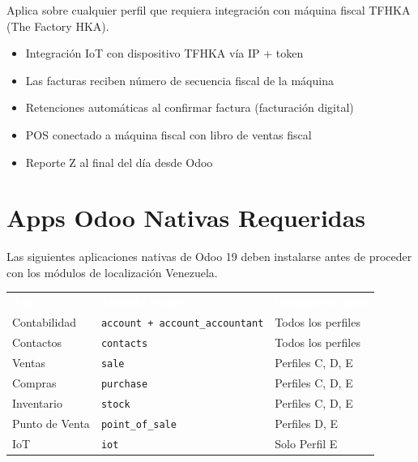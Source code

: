 \documentclass[11pt,a4paper]{article}
\newcommand{\modulo}[1]{\texttt{\textcolor{naranja}{#1}}}
\newcommand{\tchead}[1]{%
  \cellcolor{naranja}\textcolor{white}{\textbf{#1}}%
}
\begin{document}
\begin{Form}
\vspace{6pt}

\begin{tcolorbox}[perfilbox, title={Perfil E — Con Máquina Fiscal TFHKA}]
Aplica sobre cualquier perfil que requiera integración con máquina fiscal TFHKA (The Factory HKA).
\begin{itemize}[leftmargin=1.2em, itemsep=2pt]
  \item Integración IoT con dispositivo TFHKA vía IP + token
  \item Las facturas reciben número de secuencia fiscal de la máquina
  \item Retenciones automáticas al confirmar factura (facturación digital)
  \item POS conectado a máquina fiscal con libro de ventas fiscal
  \item Reporte Z al final del día desde Odoo
\end{itemize}
\end{tcolorbox}

\clearpage

\section{Apps Odoo Nativas Requeridas}

Las siguientes aplicaciones nativas de Odoo 19 deben instalarse antes de proceder con los módulos de localización Venezuela.

\begin{center}
\begin{tabular}{L{3.8cm} L{4.2cm} L{6.0cm}}
  \tchead{App} & \tchead{Módulo técnico} & \tchead{Obligatoria para} \\
  Contabilidad & \modulo{account + account\_accountant} & Todos los perfiles \\
  Contactos & \modulo{contacts} & Todos los perfiles \\
  Ventas & \modulo{sale} & Perfiles C, D, E \\
  Compras & \modulo{purchase} & Perfiles C, D, E \\
  Inventario & \modulo{stock} & Perfiles C, D, E \\
  Punto de Venta & \modulo{point\_of\_sale} & Perfiles D, E \\
  IoT & \modulo{iot} & Solo Perfil E \\
\end{tabular}
\end{center}


\end{Form}
\end{document}
